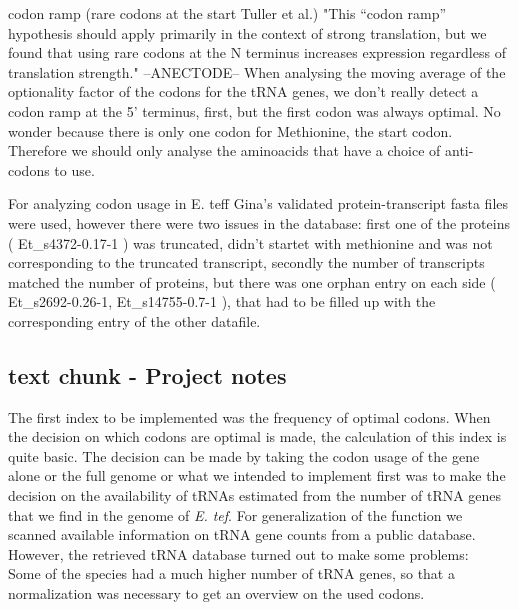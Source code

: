 codon ramp (rare codons at the start Tuller et al.) "This “codon ramp” hypothesis should apply primarily in the context of strong translation, but we found that using rare codons at the N terminus increases expression regardless of translation strength." --ANECTODE-- When analysing the moving average of the optionality factor of the codons for the tRNA genes, we don't really detect a codon ramp at the 5' terminus, first, but the first codon was always optimal. No wonder because there is only one codon for Methionine, the start codon. Therefore we should only analyse the aminoacids that have a choice of anti-codons to use.  

For analyzing codon usage in E. teff Gina's validated protein-transcript fasta files were used, however there were two issues in the database: 
first one of the proteins (
Et\_s4372-0.17-1
) was truncated, didn't startet with methionine and was not corresponding to the truncated transcript, secondly the number of transcripts matched the number of proteins, but there was one orphan entry on each side (
Et\_s2692-0.26-1, Et\_s14755-0.7-1
), that had to be filled up with the corresponding entry of the other datafile. 


\subsection{text chunk - Project notes}
The first index to be implemented was the frequency of optimal codons. When the decision on which codons are optimal is made, the calculation of this index is quite basic. The decision can be made by taking the codon usage of the gene alone or the full genome or what we intended to implement first was to make the decision on the availability of tRNAs estimated from the number of tRNA genes that we find in the genome of \textit{E. tef}. For generalization of the function we scanned available information on tRNA gene counts from a public database. However, the retrieved tRNA database turned out to make some problems: \\
Some of the species had a much higher number of tRNA genes, so that a normalization was necessary to get an overview on the used codons. %


